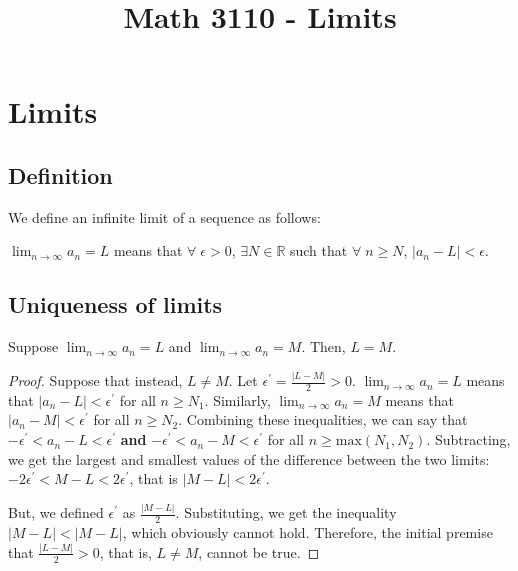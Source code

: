 

\title{Math 3110 - Limits}
\author{\name}
\maketitle

\section{Limits}
\subsection{Definition}
We define an infinite limit of a sequence as follows:

$\lim_{n \rightarrow \infty} a_n = L$ means that $\forall\; \epsilon > 0$, $\exists N \in \mathbb{R}$ such that $\forall\; n \geq N$, $|a_n - L| < \epsilon$.

\subsection{Uniqueness of limits}
Suppose $\lim_{n \rightarrow \infty} a_n = L$ and $\lim_{n \rightarrow \infty} a_n = M$. Then, $L = M$.

\begin{proof}
  Suppose that instead, $L \neq M$. Let $\epsilon^{\prime} = \frac{|L - M|}{2} > 0$. $\lim_{n \rightarrow \infty} a_n = L$ means that $|a_n - L| < \epsilon^{\prime}$ for all $n \geq N_1$. Similarly, $\lim_{n \rightarrow \infty} a_n = M$ means that $|a_n - M| < \epsilon^{\prime}$ for all $n \geq N_2$. Combining these inequalities, we can say that $-\epsilon^{\prime} < a_n - L < \epsilon^{\prime}$ \textbf{and} $-\epsilon^{\prime} < a_n - M < \epsilon^{\prime}$ for all $n \geq \mathrm{max}(N_1, N_2)$. Subtracting, we get the largest and smallest values of the difference between the two limits: $-2\epsilon^{\prime} < M - L < 2\epsilon^{\prime}$, that is $|M - L| < 2\epsilon^{\prime}$.

  But, we defined $\epsilon^{\prime}$ as $\frac{|M - L|}{2}$. Substituting, we get the inequality $|M - L| < |M - L|$, which obviously cannot hold. Therefore, the initial premise that $\frac{|L - M|}{2} > 0$, that is, $L \neq M$, cannot be true.
\end{proof}



